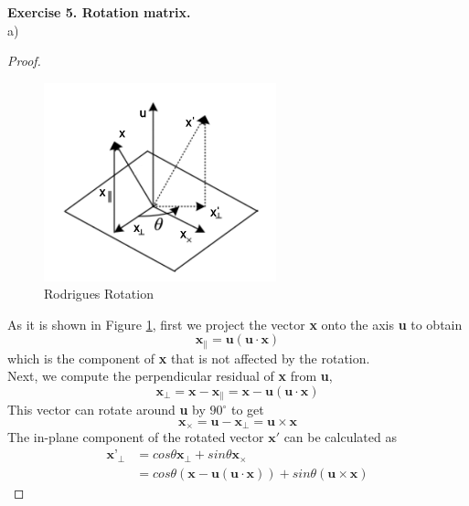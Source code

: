 \documentclass[letterpaper, 11pt]{article}
\begin{document}
\textbf{Exercise 5. Rotation matrix.}\\
a)
\begin{proof}
    \begin{figure}[!ht]
        \centering
        \includegraphics[width=0.6\textwidth]{R2E5.png}
        \caption{Rodrigues Rotation}
        \label{fig:RodriguesRotation}
    \end{figure}
    As it is shown in Figure \ref{fig:RodriguesRotation}, first we project the  vector \textbf{x} onto the axis \textbf{u} to obtain
    \begin{equation}
        \textbf{x}_{\parallel} = \textbf{u}(\textbf{u} \cdot \textbf{x})
    \end{equation}
    which is the component of \textbf{x} that is not affected by the rotation.\\
    Next, we compute the perpendicular residual of \textbf{x} from \textbf{u},
    \begin{equation}
        \textbf{x}_{\perp} = \textbf{x} - \textbf{x}_{\parallel} = \textbf{x} - \textbf{u}(\textbf{u} \cdot \textbf{x})
    \end{equation}
    This vector can rotate around \textbf{u} by $90^{\circ}$ to get
    \begin{equation}
        \textbf{x}_{\times} = \textbf{u} - \textbf{x}_{\perp} = \textbf{u} \times  \textbf{x}
    \end{equation}
    The in-plane component of the rotated vector $\textbf{x}'$ can be calculated as
    \begin{align}
        \textbf{x'}_{\perp} & = cos\theta \textbf{x}_{\perp} + sin\theta \textbf{x}_{\times}\nonumber \\
                            & = cos\theta (\textbf{x} - \textbf{u}(\textbf{u} \cdot \textbf{x})) +
        sin\theta (\textbf{u} \times  \textbf{x})
    \end{align}

\end{proof}
\end{document}
